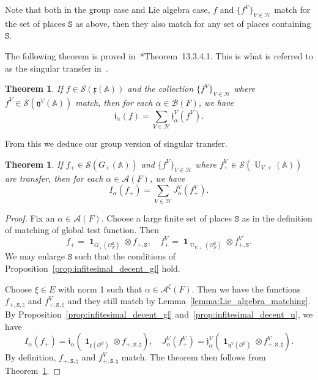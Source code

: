\documentclass[letterpaper,11pt]{amsart}
\newcommand{\fx}{\mathfrak{x}}
\newcommand{\fy}{\mathfrak{y}}
\newcommand{\bA}{\mathbb{A}}
\newcommand{\cA}{\mathcal{A}}
\newcommand{\cB}{\mathcal{B}}
\newcommand{\cH}{\mathcal{H}}
\newcommand{\cO}{\mathcal{O}}
\newcommand{\cS}{\mathcal{S}}
\newcommand{\tS}{\mathtt{S}}
\newcommand{\<}{\negthickspace}
\DeclareMathOperator{\U}{U}
\DeclareMathOperator{\id}{\mathbf{1}}
\theoremstyle{definition}
\theoremstyle{plain}
\newtheorem{theorem}[definition]{Theorem}
\theoremstyle{remark}
\numberwithin{equation}{section}
\begin{document}
Note that both in the group case and Lie algebra case, $f$ and $\{ f^V \}_{V
\in \cH}$ match for the set of places $\tS$ as above, then they also match for any set of places containing $\tS$.

The following theorem is proved in~\cite{CZ}*{Theorem~13.3.4.1}. This is what
is referred to as the singular transfer in~\cite{CZ}.

\begin{theorem} \label{thm:infintesimal_singular_transfer}
If $f \in \cS(\fx(\bA))$ and the collection $\{f^{V}\}_{V \in \cH}$ where
$f^V \in \cS(\fy^V(\bA))$ match, then for each $\alpha \in \cB(F)$, we have
    \[
    \mathfrak{i}_\alpha(f) =
    \sum_{V \in \cH} \mathfrak{j}^V_{\alpha}(f^{V}).
    \]
\end{theorem}





From this we deduce our group version of singular transfer.

\begin{theorem} \label{thm:singular_transfer}
If $f_+ \in \cS(G_+(\bA))$ and  $\{f^{V}\}_{V \in \cH}$ where $f_+^V \in
\cS(\U_{V,+}(\bA))$ are transfer, then for each $\alpha \in \cA(F)$, we have
    \[
    I_\alpha(f_+) = \sum_{V \in \cH} J^V_{\alpha}(f_+^{V}).
    \]
\end{theorem}

\begin{proof}
Fix an $\alpha \in \cA(F)$. Choose a large finite set of places $\tS$ as in
the definition of matching of global test function. Then
    \[
    f_+ = \id_{G_+(\cO^\tS_F)} \otimes f_{+, \tS}, \quad
    f^V_+ = \id_{\U_{V,+}(\cO_{F}^{\tS})} \otimes f_{+, \tS}^V.
    \]
We may enlarge $\tS$ such that the conditions of
Proposition~\ref{prop:infitesimal_decent_gl} hold.

Choose $\xi \in E$ with norm 1 such that $\alpha \in \cA^\xi(F)$. Then we have the functions $f_{+, \tS, \natural}$ and $f^V_{+, \tS, \natural}$ and they still match by Lemma~\ref{lemma:Lie_algebra_matching}. By
Proposition~\ref{prop:infitesimal_decent_gl}
and~\ref{prop:infitesimal_decent_u}, we have
    \[
    I_\alpha(f_+) = \mathfrak{i}_\alpha
    (\id_{\fx(\cO^\tS)}
    \otimes f_{+, \tS, \natural}),
    \quad
    J^V_\alpha(f^V_+) = \mathfrak{j}^V_\alpha
    (\id_{\fy^V(\cO^\tS)}
    \otimes f^V_{+, \tS, \natural}).
    \]
By definition, $f_{+, \tS, \natural}$ and $f^V_{+, \tS, \natural}$ match. The
theorem then follows from Theorem~\ref{thm:infintesimal_singular_transfer}.
\end{proof}
\end{document}
